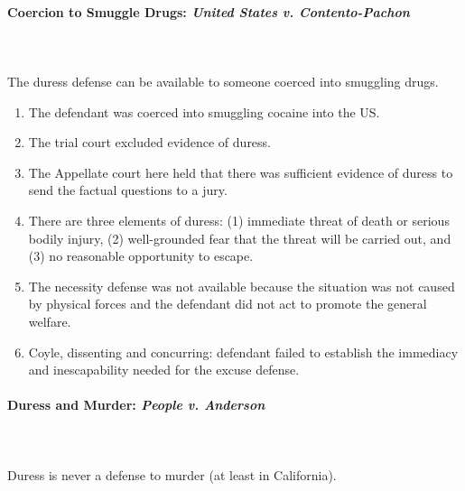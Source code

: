 \paragraph{Coercion to Smuggle Drugs: \emph{United States v. Contento-Pachon}}
~\\\\
The duress defense can be available to someone coerced into smuggling drugs.

\begin{enumerate}
    \item The defendant was coerced into smuggling cocaine into the US. 
    \item The trial court excluded evidence of duress.
    \item The Appellate court here held that there was sufficient evidence of 
    duress to send the factual questions to a jury.
    \item There are three elements of duress: (1) immediate threat of death or 
    serious bodily injury, (2) well-grounded fear that the threat will be 
    carried out, and (3) no reasonable opportunity to escape.
    \item The necessity defense was not available because the situation was 
    not caused by physical forces and the defendant did not act to promote the 
    general welfare.
    \item Coyle, dissenting and concurring: defendant failed to establish the 
    immediacy and inescapability needed for the excuse defense.
\end{enumerate}

\paragraph{Duress and Murder: \emph{People v. Anderson}}
~\\\\
Duress is never a defense to murder (at least in California).


